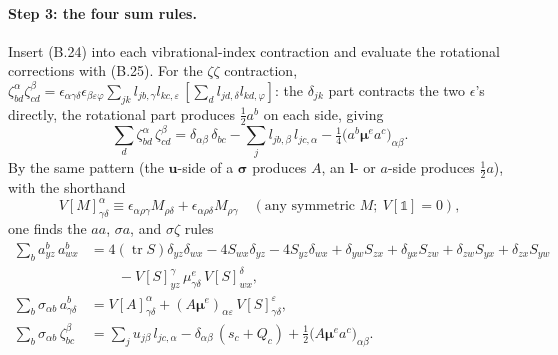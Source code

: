 \paragraph{Step 3: the four sum rules.}
Insert (B.24) into each vibrational-index contraction and evaluate the rotational corrections with (B.25). For the $\zeta\zeta$ contraction, $\zeta^\alpha_{bd}\zeta^\beta_{cd}=\epsilon_{\alpha\gamma\delta}\epsilon_{\beta\varepsilon\varphi}\sum_{jk}l_{jb,\gamma}l_{kc,\varepsilon}\,[\sum_d l_{jd,\delta}l_{kd,\varphi}]$: the $\delta_{jk}$ part contracts the two $\epsilon$'s directly, the rotational part produces $\tfrac12a^b$ on each side, giving
\begin{equation}
\sum_d\zeta^{\alpha}_{bd}\,\zeta^{\beta}_{cd}
=\delta_{\alpha\beta}\,\delta_{bc}-\sum_jl_{jb,\beta}\,l_{jc,\alpha}
-\tfrac14\bigl(a^{b}\boldsymbol\mu^{e}a^{c}\bigr)_{\alpha\beta}. \tag{B.26}
\end{equation}
By the same pattern (the $\mathbf u$-side of a $\boldsymbol\sigma$ produces $A$, an $\mathbf l$- or $a$-side produces $\tfrac12a$), with the shorthand
\begin{equation}
V[M]^{\alpha}_{\gamma\delta}\equiv\epsilon_{\alpha\rho\gamma}M_{\rho\delta}+\epsilon_{\alpha\rho\delta}M_{\rho\gamma}
\quad(\text{any symmetric }M;\ V[\mathbb 1]=0), \tag{B.27}
\end{equation}
one finds the $aa$, $\sigma a$, and $\sigma\zeta$ rules
\begin{align}
\sum_b a^{b}_{yz}\,a^{b}_{wx}
&=4(\operatorname{tr}S)\delta_{yz}\delta_{wx}-4S_{wx}\delta_{yz}-4S_{yz}\delta_{wx}
+\delta_{yw}S_{zx}+\delta_{yx}S_{zw}+\delta_{zw}S_{yx}+\delta_{zx}S_{yw}\nonumber\\
&\qquad-V[S]^{\gamma}_{yz}\,\mu^{e}_{\gamma\delta}\,V[S]^{\delta}_{wx}, \tag{B.28}\\[2pt]
\sum_b\sigma_{\alpha b}\,a^{b}_{\gamma\delta}
&=V[A]^{\alpha}_{\gamma\delta}+(A\boldsymbol\mu^{e})_{\alpha\varepsilon}\,V[S]^{\varepsilon}_{\gamma\delta}, \tag{B.29}\\[2pt]
\sum_b\sigma_{\alpha b}\,\zeta^{\beta}_{bc}
&=\sum_ju_{j\beta}\,l_{jc,\alpha}-\delta_{\alpha\beta}\,(s_c+Q_c)+\tfrac12\bigl(A\boldsymbol\mu^{e}a^{c}\bigr)_{\alpha\beta}. \tag{B.30}
\end{align}

